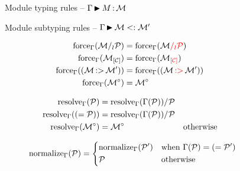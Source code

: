 \documentclass{article}
\theoremstyle{definition}
\begin{document}
\begin{figure}[!p]
  \vspace{-3mm}
  \caption{Module typing rules -- $\Gamma \operatorname{\blacktriangleright}_{} M \operatorname{:} \mathcal M$}
  \label{module:typing}

  \vspace{-3mm}
  \caption{Module subtyping rules -- $\Gamma \operatorname{\blacktriangleright}_{} \mathcal M <: \mathcal M'$}
  \label{module:subtyping}
\end{figure}

\begin{figure}[hbt]
  \vspace{-3mm}
  \caption{Lookup rules -- $\lookup{\E}{\ip} = \iM$}
  \label{module:lookup}

  \begin{subfigure}[t]{0.3\linewidth}
    \begin{align*}
      \operatorname{force}_{\Gamma}(\mathcal M/_{l}\mathcal P)
      &= \operatorname{force}_{\Gamma}(\mathcal M{\color{red}/_{l}\mathcal P})\\
      \operatorname{force}_{\Gamma}({\mathcal M}_{\color{black}\left[\mathcal C\right]})
      &= \operatorname{force}_{\Gamma}({\mathcal M}_{\color{red}\left[\mathcal C\right]})\\
      \operatorname{force}_{\Gamma}((\mathcal M \operatorname{:\!>} \mathcal M'))
      &= \operatorname{force}_{\Gamma}((\mathcal M \operatorname{{\color{red}:\!>}} \mathcal M'))\\
      \operatorname{force}_{\Gamma}({\mathcal M^\circ}) &= {\mathcal M^\circ}
    \end{align*}
  \end{subfigure}
  \begin{subfigure}[t]{0.33\linewidth}
    \begin{align*}
      \operatorname{resolve}_{\Gamma}(\mathcal P)
      &= \operatorname{resolve}_{\Gamma}(\Gamma(\mathcal P))/_{}\mathcal P\\
      \operatorname{resolve}_{\Gamma}((= \mathcal P))
      &= \operatorname{resolve}_{\Gamma}(\Gamma(\mathcal P))/_{}\mathcal P\\
      \operatorname{resolve}_{\Gamma}({\mathcal M^\circ}) &= {\mathcal M^\circ} & \text{otherwise} \\
    \end{align*}
  \end{subfigure}
  \begin{subfigure}[t]{0.33\linewidth}
    \begin{align*}
      \operatorname{normalize}_{\Gamma}(\mathcal P)
      &=
        \begin{dcases}
          \operatorname{normalize}_{\Gamma}(\mathcal P') & \text{when } \Gamma(\mathcal P) = (= \mathcal P') \\
          \mathcal P & \text{otherwise}
        \end{dcases}
    \end{align*}
  \end{subfigure}

\end{figure}
\end{document}
